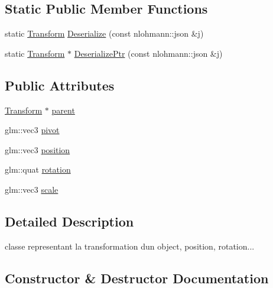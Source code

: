 \subsection*{Static Public Member Functions}
\begin{DoxyCompactItemize}
\item 
static \mbox{\hyperlink{class_beer_engine_1_1_transform}{Transform}} \mbox{\hyperlink{class_beer_engine_1_1_transform_a886b373a8708f3ea638925d49c51fff4}{Deserialize}} (const nlohmann\+::json \&j)
\item 
static \mbox{\hyperlink{class_beer_engine_1_1_transform}{Transform}} $\ast$ \mbox{\hyperlink{class_beer_engine_1_1_transform_ad3a0ee89fdc0113a71de681ae099dd52}{Deserialize\+Ptr}} (const nlohmann\+::json \&j)
\end{DoxyCompactItemize}
\subsection*{Public Attributes}
\begin{DoxyCompactItemize}
\item 
\mbox{\hyperlink{class_beer_engine_1_1_transform}{Transform}} $\ast$ \mbox{\hyperlink{class_beer_engine_1_1_transform_a1096d0e1363f83258f60cbf766f7443f}{parent}}
\item 
glm\+::vec3 \mbox{\hyperlink{class_beer_engine_1_1_transform_ae27065923507f46d0257c9f77e37161e}{pivot}}
\item 
glm\+::vec3 \mbox{\hyperlink{class_beer_engine_1_1_transform_ab5d559938ee0d636faaf10750733d974}{position}}
\item 
glm\+::quat \mbox{\hyperlink{class_beer_engine_1_1_transform_a0b2499263e149d0d25ad0661f7f26069}{rotation}}
\item 
glm\+::vec3 \mbox{\hyperlink{class_beer_engine_1_1_transform_aec3b8b1a22e1b01b36f483cf7684d721}{scale}}
\end{DoxyCompactItemize}


\subsection{Detailed Description}
classe representant la transformation d\textquotesingle{}un object, position, rotation... 

\subsection{Constructor \& Destructor Documentation}
\mbox{\label{class_beer_engine_1_1_transform_aef3a2967a1503883c86bd74a3c6921fc}} 
